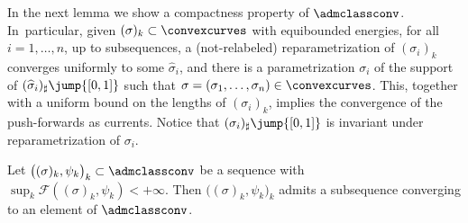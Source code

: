 In the next lemma we show a compactness property of $\admclassconv$. In~particular, given $(\sigma)_k\subset\convexcurves$ with equibounded energies, for all $i=1,\dots,n$, up to subsequences, a (not-relabeled) reparametrization of $(\sigma_i)_k$ converges uniformly to some $\widehat\sigma_i$, and there is a parametrization $\sigma_i$ of the support of $(\widehat \sigma_i)_\sharp\jump{[0,1]}$ such that $\sigma=(\sigma_1,\dots,\sigma_n)\in\convexcurves$. This,
together with a uniform bound on the lengths of $(\sigma_i)_k$, implies the convergence of the push-forwards as currents. Notice that $(\sigma_i)_\sharp\jump{[0,1]}$ is invariant under reparametrization of $\sigma_i$.

\begin{lemma}\label{lem:compactness}
Let
$\big((\sigma)_{k},\psi_k\big)_k
\subset\admclassconv$ be a sequence with\\ $\sup_k\mathcal F((\sigma)_k,\psi_k)<+\infty$. Then
$\big((\sigma)_{k},\psi_k\big)_k$ admits
a subsequence converging to an element of $\admclassconv$.
\end{lemma}
